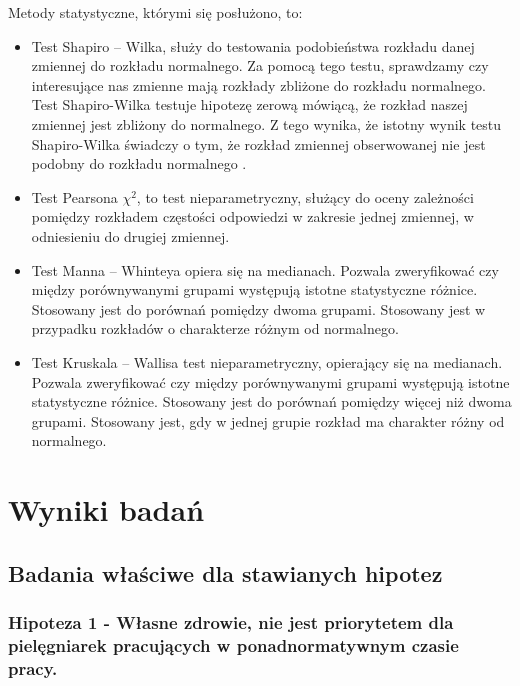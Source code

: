 \documentclass[a4paper,12pt,twoside,openany]{report}
\begin{document}
Metody statystyczne, którymi się posłużono, to:
\begin{itemize}
     \item Test Shapiro – Wilka, służy do testowania podobieństwa rozkładu danej zmiennej do rozkładu normalnego. Za pomocą tego testu, sprawdzamy czy interesujące nas zmienne mają rozkłady zbliżone do rozkładu normalnego. Test Shapiro-Wilka testuje hipotezę zerową mówiącą, że rozkład naszej zmiennej jest zbliżony do normalnego. Z tego wynika, że istotny wynik testu Shapiro-Wilka świadczy o tym, że rozkład zmiennej obserwowanej nie jest podobny do rozkładu normalnego \cite{ShapWilk}. 
    
     \item Test Pearsona $\chi^2$, to test nieparametryczny, służący do oceny zależności pomiędzy rozkładem częstości odpowiedzi w zakresie jednej zmiennej, w odniesieniu do drugiej zmiennej.
     
     \item Test Manna – Whinteya opiera się na medianach. Pozwala zweryfikować czy między porównywanymi grupami występują istotne statystyczne różnice. Stosowany jest do porównań pomiędzy dwoma grupami. Stosowany jest w przypadku rozkładów o charakterze różnym od normalnego.
    
     \item Test Kruskala – Wallisa test nieparametryczny, opierający się na medianach. Pozwala zweryfikować czy między porównywanymi grupami występują istotne statystyczne różnice. Stosowany jest do porównań pomiędzy więcej niż dwoma grupami. Stosowany jest, gdy w jednej grupie rozkład ma charakter różny od normalnego.
     
     

\end{itemize}



\chapter{Wyniki badań}


\section*{Badania właściwe dla stawianych hipotez}


\subsection* {Hipoteza 1 - Własne zdrowie, nie jest priorytetem  dla pielęgniarek pracujących w ponadnormatywnym czasie pracy.}
\end{document}
